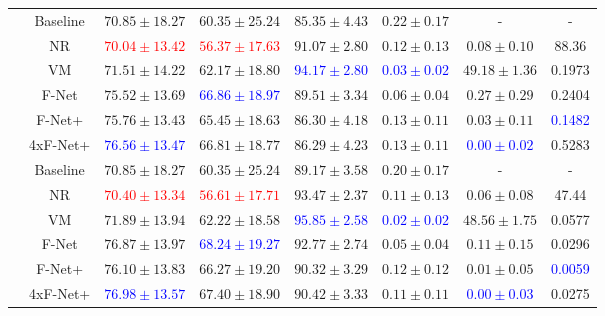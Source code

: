 \documentclass[english,version-2022-01]{uzl-thesis} %
\begin{document}
\begin{table}[h]
\begin{tabular}{c c c c c c c c}
		\midrule
		\multirow{6}{*}{\rotatebox{90}{$R=8$}} & Baseline & $70.85 \pm 18.27$ & $60.35 \pm 25.24$ & $85.35 \pm 4.43$ & $0.22 \pm 0.17$ & - & -\\  
		 & NR & \textcolor{red}{$70.04 \pm 13.42$} & \textcolor{red}{$56.37 \pm 17.63$} & $91.07 \pm 2.80$ & $0.12 \pm 0.13$ & $0.08 \pm 0.10$ & 88.36 \\
		 & VM & $71.51 \pm 14.22$ & $62.17 \pm 18.80$ & \textcolor{blue}{$94.17 \pm 2.80$} & \textcolor{blue}{$0.03 \pm 0.02$} & $49.18 \pm 1.36$ & 0.1973\\	
		 & F-Net & $75.52 \pm 13.69$ & \textcolor{blue}{$66.86 \pm 18.97$} & $89.51 \pm 3.34$ & $0.06 \pm 0.04$ & $0.27 \pm 0.29$ & 0.2404\\ 
		 & F-Net+ & $75.76 \pm 13.43$ & $65.45 \pm 18.63$ & $86.30 \pm 4.18$ & $0.13 \pm 0.11$ & $0.03 \pm 0.11$ & \textcolor{blue}{0.1482}\\ 
		 & 4xF-Net+ & \textcolor{blue}{$76.56 \pm 13.47$} & $66.81 \pm 18.77$ & $86.29 \pm 4.23$ & $0.13 \pm 0.11$ & \textcolor{blue}{$0.00 \pm 0.02$} & 0.5283\\ 
		 	 
		\midrule		
		\multirow{6}{*}{\rotatebox{90}{$R=10$}} & Baseline & $70.85 \pm 18.27$ & $60.35 \pm 25.24$ & $89.17 \pm 3.58$ & $0.20 \pm 0.17$ & - & -\\ 
		 & NR & \textcolor{red}{$70.40 \pm 13.34$} & \textcolor{red}{$56.61 \pm 17.71$} & $93.47 \pm 2.37$ & $0.11 \pm 0.13$ & $0.06 \pm 0.08$ & 47.44 \\
		 & VM & $71.89 \pm 13.94$ & $62.22 \pm 18.58$ & \textcolor{blue}{$95.85 \pm 2.58$} & \textcolor{blue}{$0.02 \pm 0.02$} & $48.56 \pm 1.75$ & 0.0577\\	 %
		 & F-Net & $76.87 \pm 13.97$ & \textcolor{blue}{$68.24 \pm 19.27$} & $92.77 \pm 2.74$ & $0.05 \pm 0.04$ & $0.11 \pm 0.15$ & 0.0296\\ 
		 & F-Net+ & $76.10 \pm 13.83$ & $66.27 \pm 19.20$ & $90.32 \pm 3.29$ & $0.12 \pm 0.12$ & $0.01 \pm 0.05$ & \textcolor{blue}{0.0059}\\ 
		 & 4xF-Net+ & \textcolor{blue}{$76.98 \pm 13.57$} & $67.40 \pm 18.90$ & $90.42 \pm 3.33$ & $0.11 \pm 0.11$ & \textcolor{blue}{$0.00 \pm 0.03$} & 0.0275\\ 
		 \bottomrule
	\end{tabular}
\end{table}
\end{document}
